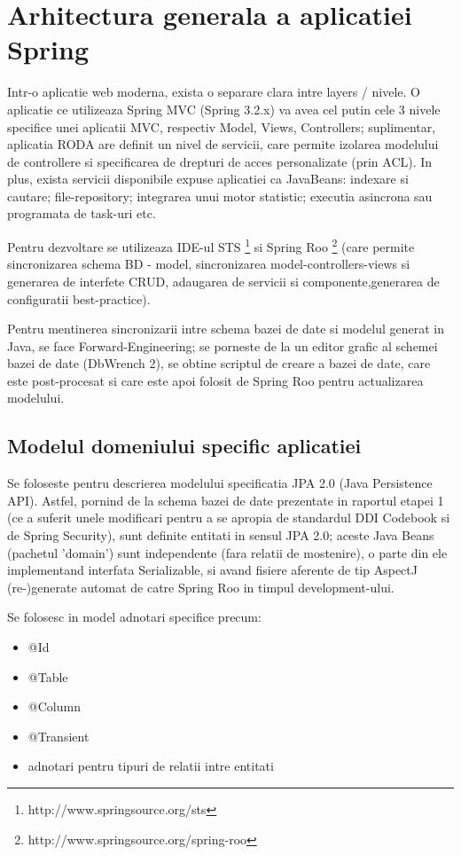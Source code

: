 \section{Arhitectura generala a aplicatiei Spring}

Intr-o aplicatie web moderna, exista o separare clara intre layers /
nivele. O aplicatie ce utilizeaza Spring MVC (Spring 3.2.x) va avea cel putin
cele 3 nivele specifice unei aplicatii MVC, respectiv Model, Views, Controllers; suplimentar,
aplicatia RODA are definit un nivel de servicii, care permite izolarea modelului
de controllere si specificarea de drepturi de acces personalizate (prin ACL). In
plus, exista servicii disponibile expuse aplicatiei ca JavaBeans: indexare si
cautare; file-repository; integrarea unui motor statistic; executia asincrona
sau programata de task-uri etc.


Pentru dezvoltare se utilizeaza IDE-ul STS
\footnote{http://www.springsource.org/sts}
si Spring Roo
\footnote{http://www.springsource.org/spring-roo} (care permite sincronizarea
schema BD - model, sincronizarea model-controllers-views si generarea de
interfete CRUD, adaugarea de servicii si componente,generarea de configuratii
best-practice).

Pentru mentinerea sincronizarii intre schema bazei de date si modelul generat
in Java, se face Forward-Engineering; se porneste de la un editor grafic al
schemei bazei de date (DbWrench 2), se obtine scriptul de creare a bazei de
date, care este post-procesat si care este apoi folosit de Spring Roo pentru
actualizarea modelului.

\subsection{Modelul domeniului specific aplicatiei}
Se foloseste pentru descrierea modelului specificatia JPA 2.0 (Java Persistence
API).
Astfel, pornind de la schema bazei de date prezentate in raportul etapei 1 (ce
a suferit unele modificari pentru a se apropia de standardul DDI Codebook si
de Spring Security), sunt definite entitati in sensul JPA 2.0; aceste Java Beans
(pachetul 'domain') sunt independente (fara relatii de mostenire), o parte din ele
implementand interfata Serializable, si avand fisiere aferente de tip AspectJ
(re-)generate automat de catre Spring Roo in timpul development-ului.

Se folosesc in model adnotari specifice precum:
\begin{itemize}
  \item @Id
  \item @Table
  \item @Column
  \item @Transient
  \item adnotari pentru tipuri de relatii intre entitati
\end{itemize}

